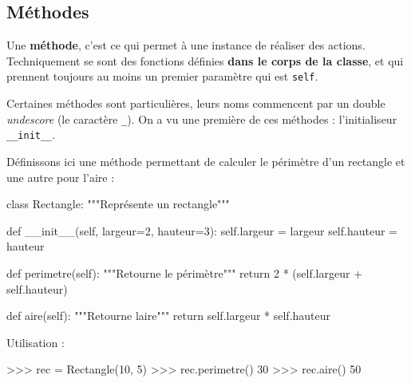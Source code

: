 \documentclass[
  letterpaper,
  DIV=11,
  numbers=noendperiod]{scrartcl}
\newenvironment{Shaded}{\begin{snugshade}}{\end{snugshade}}
\newcommand{\CommentTok}[1]{\textcolor[rgb]{0.37,0.37,0.37}{#1}}
\newcommand{\ControlFlowTok}[1]{\textcolor[rgb]{0.00,0.23,0.31}{#1}}
\newcommand{\DecValTok}[1]{\textcolor[rgb]{0.68,0.00,0.00}{#1}}
\newcommand{\FunctionTok}[1]{\textcolor[rgb]{0.28,0.35,0.67}{#1}}
\newcommand{\KeywordTok}[1]{\textcolor[rgb]{0.00,0.23,0.31}{#1}}
\newcommand{\NormalTok}[1]{\textcolor[rgb]{0.00,0.23,0.31}{#1}}
\newcommand{\OperatorTok}[1]{\textcolor[rgb]{0.37,0.37,0.37}{#1}}
\newcommand{\VariableTok}[1]{\textcolor[rgb]{0.07,0.07,0.07}{#1}}
\begin{document}
\hypertarget{muxe9thodes}{%
\subsection{Méthodes}\label{muxe9thodes}}

Une \textbf{méthode}, c'est ce qui permet à une instance de réaliser des
actions. Techniquement se sont des fonctions définies \textbf{dans le
corps de la classe}, et qui prennent toujours au moins un premier
paramètre qui est \texttt{self}.

Certaines méthodes sont particulières, leurs noms commencent par un
double \emph{undescore} (le caractère \texttt{\_}). On a vu une première
de ces méthodes : l'initialiseur \texttt{\_\_init\_\_}.

Définissons ici une méthode permettant de calculer le périmètre d'un
rectangle et une autre pour l'aire :

\begin{Shaded}
\begin{Highlighting}[]
\KeywordTok{class}\NormalTok{ Rectangle:}
    \CommentTok{"""Représente un rectangle"""}

    \KeywordTok{def} \FunctionTok{\_\_init\_\_}\NormalTok{(}\VariableTok{self}\NormalTok{, largeur}\OperatorTok{=}\DecValTok{2}\NormalTok{, hauteur}\OperatorTok{=}\DecValTok{3}\NormalTok{):}
        \VariableTok{self}\NormalTok{.largeur }\OperatorTok{=}\NormalTok{ largeur}
        \VariableTok{self}\NormalTok{.hauteur }\OperatorTok{=}\NormalTok{ hauteur}

    \KeywordTok{def}\NormalTok{ perimetre(}\VariableTok{self}\NormalTok{):}
        \CommentTok{"""Retourne le périmètre"""}
        \ControlFlowTok{return} \DecValTok{2} \OperatorTok{*}\NormalTok{ (}\VariableTok{self}\NormalTok{.largeur }\OperatorTok{+} \VariableTok{self}\NormalTok{.hauteur)}

    \KeywordTok{def}\NormalTok{ aire(}\VariableTok{self}\NormalTok{):}
        \CommentTok{"""Retourne l\textquotesingle{}aire"""}
        \ControlFlowTok{return} \VariableTok{self}\NormalTok{.largeur }\OperatorTok{*} \VariableTok{self}\NormalTok{.hauteur}
\end{Highlighting}
\end{Shaded}

Utilisation :

\begin{Shaded}
\begin{Highlighting}[]
\OperatorTok{\textgreater{}\textgreater{}\textgreater{}}\NormalTok{ rec }\OperatorTok{=}\NormalTok{ Rectangle(}\DecValTok{10}\NormalTok{, }\DecValTok{5}\NormalTok{)}
\OperatorTok{\textgreater{}\textgreater{}\textgreater{}}\NormalTok{ rec.perimetre()}
\DecValTok{30}
\OperatorTok{\textgreater{}\textgreater{}\textgreater{}}\NormalTok{ rec.aire()}
\DecValTok{50}
\end{Highlighting}
\end{Shaded}
\end{document}
